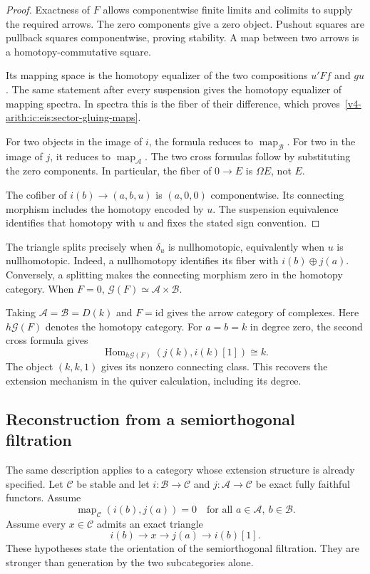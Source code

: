 \begin{proof}
Exactness of $F$ allows componentwise finite limits and colimits to
supply the required arrows. The zero components give a zero object.
Pushout squares are pullback squares componentwise, proving stability.
A map between two arrows is a homotopy-commutative square.

Its mapping
space is the homotopy equalizer of the two compositions $u'Ff$ and $gu$.
The same statement after every suspension gives the homotopy equalizer
of mapping spectra. In spectra this is the fiber of their difference,
which proves~\eqref{v4-arith:ic:eis:sector-gluing-maps}.

For two objects in the image of $i$, the formula reduces to
$\operatorname{map}_{\mathcal B}$. For two in the image of $j$, it
reduces to $\operatorname{map}_{\mathcal A}$.
The two cross formulas follow by substituting the zero components.
In particular, the fiber of $0\to E$ is $\Omega E$, not $E$.

The cofiber of $i(b)\to(a,b,u)$ is $(a,0,0)$ componentwise.
Its connecting morphism includes the homotopy encoded by $u$.
The suspension equivalence identifies that homotopy with $u$ and fixes
the stated sign convention.
\end{proof}

The triangle splits precisely when $\delta_u$ is nullhomotopic,
equivalently when $u$ is nullhomotopic. Indeed, a nullhomotopy identifies
its fiber with $i(b)\oplus j(a)$. Conversely, a splitting makes the
connecting morphism zero in the homotopy category. When $F=0$,
$\mathcal G(F)\simeq\mathcal A\times\mathcal B$.

Taking $\mathcal A=\mathcal B=D(k)$ and $F=\mathrm{id}$ gives the
arrow category of complexes. Here $h\mathcal G(F)$ denotes the homotopy category.
For $a=b=k$ in degree zero, the second
cross formula gives
\[
 \operatorname{Hom}_{h\mathcal G(F)}(j(k),i(k)[1])\cong k.
\]
The object $(k,k,1)$ gives its nonzero connecting class. This recovers
the extension mechanism in the quiver calculation, including its degree.

\subsection{Reconstruction from a semiorthogonal filtration}

The same description applies to a category whose extension structure is
already specified. Let $\mathcal C$ be stable and let
$i:\mathcal B\to\mathcal C$ and $j:\mathcal A\to\mathcal C$ be exact
fully faithful functors. Assume
\[
 \operatorname{map}_{\mathcal C}(i(b),j(a))=0
 \quad\text{for all }a\in\mathcal A,\ b\in\mathcal B.
\]
Assume every $x\in\mathcal C$ admits an exact triangle
\[
 i(b)\longrightarrow x\longrightarrow j(a)\longrightarrow i(b)[1].
\]
These hypotheses state the orientation of the semiorthogonal filtration.
They are stronger than generation by the two subcategories alone.

